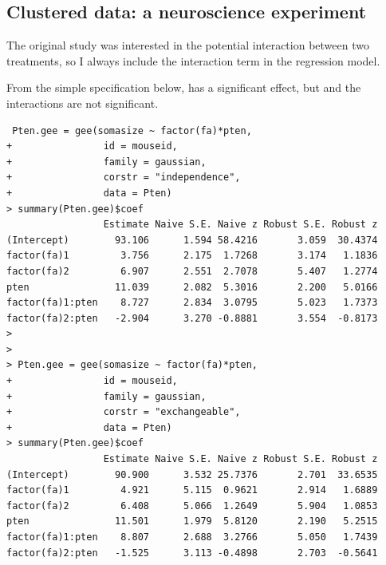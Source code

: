 \subsection{Clustered data: a neuroscience experiment} 


The original study was interested in the potential interaction between two treatments, so I always include the interaction term in the regression model. 


From the simple specification below,  has a significant effect, but  and the interactions are not significant.
\begin{lstlisting}
 Pten.gee = gee(somasize ~ factor(fa)*pten, 
+                id = mouseid, 
+                family = gaussian, 
+                corstr = "independence",
+                data = Pten)
> summary(Pten.gee)$coef 
                 Estimate Naive S.E. Naive z Robust S.E. Robust z
(Intercept)        93.106      1.594 58.4216       3.059  30.4374
factor(fa)1         3.756      2.175  1.7268       3.174   1.1836
factor(fa)2         6.907      2.551  2.7078       5.407   1.2774
pten               11.039      2.082  5.3016       2.200   5.0166
factor(fa)1:pten    8.727      2.834  3.0795       5.023   1.7373
factor(fa)2:pten   -2.904      3.270 -0.8881       3.554  -0.8173
> 
> 
> Pten.gee = gee(somasize ~ factor(fa)*pten, 
+                id = mouseid, 
+                family = gaussian, 
+                corstr = "exchangeable",
+                data = Pten)
> summary(Pten.gee)$coef
                 Estimate Naive S.E. Naive z Robust S.E. Robust z
(Intercept)        90.900      3.532 25.7376       2.701  33.6535
factor(fa)1         4.921      5.115  0.9621       2.914   1.6889
factor(fa)2         6.408      5.066  1.2649       5.904   1.0853
pten               11.501      1.979  5.8120       2.190   5.2515
factor(fa)1:pten    8.807      2.688  3.2766       5.050   1.7439
factor(fa)2:pten   -1.525      3.113 -0.4898       2.703  -0.5641
\end{lstlisting}
 
 
 
